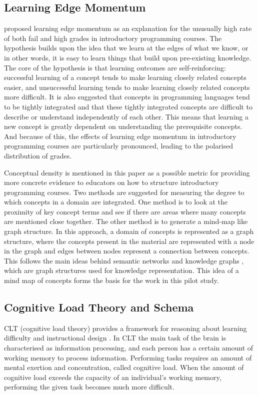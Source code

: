 \documentclass[12pt]{article}
\theoremstyle{grammarstyle}
\begin{document}
\subsection{Learning Edge Momentum}
\cite{robins2010learning} proposed learning edge momentum as an explanation for the unusually high rate of both fail and high grades in introductory programming courses. The hypothesis builds upon the idea that we learn at the edges of what we know, or in other words, it is easy to learn things that build upon pre-existing knowledge. The core of the hypothesis is that learning outcomes are self-reinforcing: successful learning of a concept tends to make learning closely related concepts easier, and unsuccessful learning tends to make learning closely related concepts more difficult. It is also suggested that concepts in programming languages tend to be tightly integrated and that these tightly integrated concepts are difficult to describe or understand independently of each other. This means that learning a new concept is greatly dependent on understanding the prerequisite concepts. And because of this, the effects of learning edge momentum in introductory programming courses are particularly pronounced, leading to the polarised distribution of grades.

Conceptual density is mentioned in this paper as a possible metric for providing more concrete evidence to educators on how to structure introductory programming courses. Two methods are suggested for measuring the degree to which concepts in a domain are integrated. One method is to look at the proximity of key concept terms and see if there are areas where many concepts are mentioned close together. The other method is to generate a mind-map like graph structure. In this approach, a domain of concepts is represented as a graph structure, where the concepts present in the material are represented with a node in the graph and edges between nodes represent a connection between concepts. This follows the main ideas behind semantic networks and knowledge graphs \citep{sowa1987semantic, zhang2002knowledge, koncel2019text}, which are graph structures used for knowledge representation. This idea of a mind map of concepts forms the basis for the work in this pilot study.

\subsection{Cognitive Load Theory and Schema}
CLT (cognitive load theory) provides a framework for reasoning about learning difficulty and instructional design \citep{sweller1994cognitive}. In CLT the main task of the brain is characterised as information processing, and each person has a certain amount of working memory to process information. Performing tasks requires an amount of mental exertion and concentration, called cognitive load. When the amount of cognitive load exceeds the capacity of an individual's working memory, performing the given task becomes much more difficult.
\end{document}
